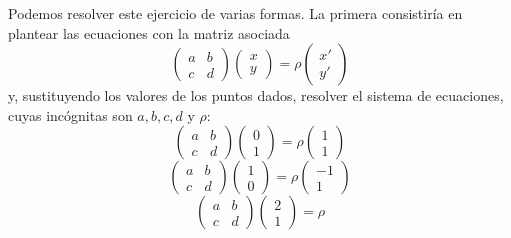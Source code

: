 \begin{exa}
	Podemos resolver este ejercicio de varias formas. La primera consistiría en plantear las ecuaciones con la matriz asociada
	\begin{equation*}
		\left( \begin{array}{cc}
			a&b\\ c&d
		\end{array}\right) 
		\left( \begin{array}{c}
			x\\ y
		\end{array}\right)=\rho
		\left( \begin{array}{c}
		x'\\ y'
	\end{array}\right)
	\end{equation*}
	y, sustituyendo los valores de los puntos dados, resolver el sistema de ecuaciones, cuyas incógnitas son $a,b,c,d$ y $\rho$:
	\begin{equation*}
		\left( \begin{array}{cc}
			a&b\\ c&d
		\end{array}\right) 
		\left( \begin{array}{c}
			0\\ 1
		\end{array}\right)=\rho
		\left( \begin{array}{c}
			1\\ 1
		\end{array}\right)
	\end{equation*}
	\begin{equation*}
		\left( \begin{array}{cc}
			a&b\\ c&d
		\end{array}\right) 
		\left( \begin{array}{c}
			1\\ 0
		\end{array}\right)=\rho
		\left( \begin{array}{c}
			-1\\ 1
		\end{array}\right)
	\end{equation*}
	\begin{equation*}
		\left( \begin{array}{cc}
			a&b\\ c&d
		\end{array}\right) 
		\left( \begin{array}{c}
			2\\ 1
		\end{array}\right)=\rho

\end{equation*}
\end{exa}
